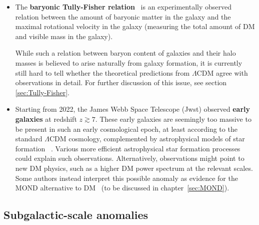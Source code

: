 \begin{itemize}
However, more mundane astrophysical explanations do exist. 
Some simulations suggest that rotating bars within DM halos can persist, if the bars formed late in the galaxy's history, potentially through a merging event. 
Additionally, certain studies find that a cored DM distribution in Fornax could prevent the inward migration of globular clusters, a phenomenon referred to as \emph{core stalling}~\cite{DynamicalFriction}. 

\item[$\blacktriangleright$]
The {\bf baryonic Tully-Fisher relation}~\cite{Tully-Fisher} is an experimentally observed relation between  the amount of baryonic matter in the galaxy and the maximal rotational velocity in the galaxy (measuring the total amount of DM and visible mass in the galaxy). 

While such a relation between baryon content of galaxies and their halo masses is believed to  arise naturally from galaxy formation, it is currently still hard to tell whether the theoretical predictions from $\Lambda$CDM agree with observations in detail. For further discussion of this issue, see section \ref{sec:Tully-Fisher}. 


\item[$\blacktriangleright$]
Starting from 2022, the James Webb Space Telescope ({\sc Jwst}) observed {\bf early galaxies} at redshift $z\gtrsim 7$. These early galaxies are seemingly too massive to be present
in such an early cosmological epoch, at least according to the standard $\Lambda$CDM cosmology, complemented by astrophysical models of star formation ~\cite{JWSTearlygal}.
Various more efficient astrophysical star formation processes could explain such observations.
Alternatively, observations might point to new DM physics, such as a higher DM power spectrum at the relevant scales.
Some authors instead interpret this possible anomaly as evidence for the MOND alternative to DM~\cite{JWSTearlygal} (to be discussed in chapter~\ref{sec:MOND}).


\end{itemize}



\subsection{Subgalactic-scale anomalies}\label{sec:missingsatellite}

